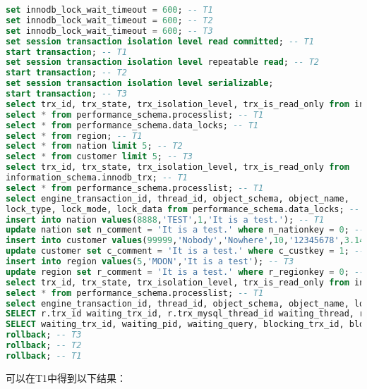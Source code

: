 \documentclass{article}
\begin{document}
\begin{lstlisting}[language=sql]
set innodb_lock_wait_timeout = 600; -- T1
set innodb_lock_wait_timeout = 600; -- T2
set innodb_lock_wait_timeout = 600; -- T3
set session transaction isolation level read committed; -- T1
start transaction; -- T1
set session transaction isolation level repeatable read; -- T2
start transaction; -- T2
set session transaction isolation level serializable;
start transaction; -- T3
select trx_id, trx_state, trx_isolation_level, trx_is_read_only from information_schema.innodb_trx; -- T1
select * from performance_schema.processlist; -- T1
select * from performance_schema.data_locks; -- T1
select * from region; -- T1
select * from nation limit 5; -- T2
select * from customer limit 5; -- T3
select trx_id, trx_state, trx_isolation_level, trx_is_read_only from
information_schema.innodb_trx; -- T1
select * from performance_schema.processlist; -- T1
select engine_transaction_id, thread_id, object_schema, object_name,
lock_type, lock_mode, lock_data from performance_schema.data_locks; -- T1
insert into nation values(8888,'TEST',1,'It is a test.'); -- T1
update nation set n_comment = 'It is a test.' where n_nationkey = 0; -- T1
insert into customer values(99999,'Nobody','Nowhere',10,'12345678',3.14,'BUILDING','It is a test.'); -- T2
update customer set c_comment = 'It is a test.' where c_custkey = 1; -- T2
insert into region values(5,'MOON','It is a test'); -- T3
update region set r_comment = 'It is a test.' where r_regionkey = 0; -- T3
select trx_id, trx_state, trx_isolation_level, trx_is_read_only from information_schema.innodb_trx; -- T1
select * from performance_schema.processlist; -- T1
select engine_transaction_id, thread_id, object_schema, object_name, lock_type, lock_mode, lock_data from performance_schema.data_locks; -- T1
SELECT r.trx_id waiting_trx_id, r.trx_mysql_thread_id waiting_thread, r.trx_query waiting_query, b.trx_id blocking_trx_id, b.trx_mysql_thread_id blocking_thread, b.trx_query blocking_query FROM performance_schema.data_lock_waits w INNER JOIN information_schema.innodb_trx b ON b.trx_id = w.blocking_engine_transaction_id INNER JOIN information_schema.innodb_trx r ON r.trx_id = w.requesting_engine_transaction_id; -- T1
SELECT waiting_trx_id, waiting_pid, waiting_query, blocking_trx_id, blocking_pid, blocking_query FROM sys.innodb_lock_waits; -- T1
rollback; -- T3
rollback; -- T2
rollback; -- T1
\end{lstlisting}

可以在T1中得到以下结果：
\end{document}
